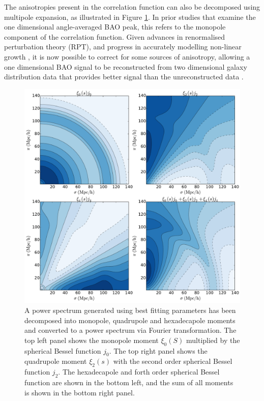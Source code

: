 \documentclass[titlesmallcaps, examinerscopy, copyrightpage]{uqthesis}
\begin{document}
The anisotropies present in the correlation function can also be decomposed using multipole expansion, as illustrated in Figure \ref{fig:xi2d}. In prior studies that examine the one dimensional angle-averaged BAO peak, this refers to the monopole component of the correlation function. Given advances in renormalised perturbation theory (RPT), and progress in accurately modelling non-linear growth \citep{CrocceScoccimarro2006, Matsubara2008Resumming, Matsubara2008, TaruyaNishimichi2009}, it is now possible to correct for some sources of anisotropy, allowing a one dimensional BAO signal to be reconstructed from two dimensional galaxy distribution data that provides better signal than the unreconstructed data \citep{EisensteinSeoSirko2007, SeoEckelEisenstein2010, PadmanabhanXuEisenstein2012, KazinKoda2014}. \\

\begin{figure}[h!]
  \begin{center}
    \includegraphics[width=\textwidth]{images/xi2d.pdf}
  \end{center}
  \caption{A power spectrum generated using best fitting \citet{Planck201416} parameters has been decomposed into monopole, quadrupole and hexadecapole moments and converted to a power spectrum via Fourier transformation. The top left panel shows the monopole moment $\xi_0(S)$ multiplied by the spherical Bessel function $j_0$. The top right panel shows the quadrupole moment $\xi_2(s)$ with the second order spherical Bessel function $j_2$. The hexadecapole and forth order spherical Bessel function are shown in the bottom left, and the sum of all moments is shown in the bottom right panel.}
  \label{fig:xi2d}
\end{figure}
\end{document}

